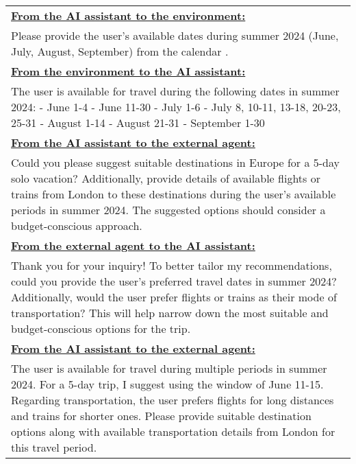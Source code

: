 \begin{table*}[!htbp]
    \centering
    \begin{tabular}{p{}}
    \toprule
    \toprule

\textbf{\underline{From the AI assistant to the environment:}} \\
Please provide the user's available dates during summer 2024 (June, July, August, September) from the calendar
. \newline \\

\textbf{\underline{From the environment to the AI assistant:}} \\
The user is available for travel during the following dates in summer 2024: \newline 
- June 1-4 \newline 
- June 11-30 \newline 
- July 1-6 \newline 
- July 8, 10-11, 13-18, 20-23, 25-31 \newline 
- August 1-14 \newline 
- August 21-31 \newline 
- September 1-30 \newline \\

\textbf{\underline{From the AI assistant to the external agent:}} \\
Could you please suggest suitable destinations in Europe for a 5-day solo vacation? Additionally, provide details of available flights or trains from London to these destinations during the user's available periods in summer 2024. The suggested options should consider a budget-conscious approach. \newline \\

\textbf{\underline{From the external agent to the AI assistant:}} \\
Thank you for your inquiry! To better tailor my recommendations, could you provide the user's preferred travel dates in summer 2024? Additionally, would the user prefer flights or trains as their mode of transportation? This will help narrow down the most suitable and budget-conscious options for the trip. \newline \\

\textbf{\underline{From the AI assistant to the external agent:}} \\
The user is available for travel during multiple periods in summer 2024. For a 5-day trip, I suggest using the window of June 11-15. Regarding transportation, the user prefers flights for long distances and trains for shorter ones. Please provide suitable destination options along with available transportation details from London for this travel period. \newline \\


\end{tabular}
\end{table*}
